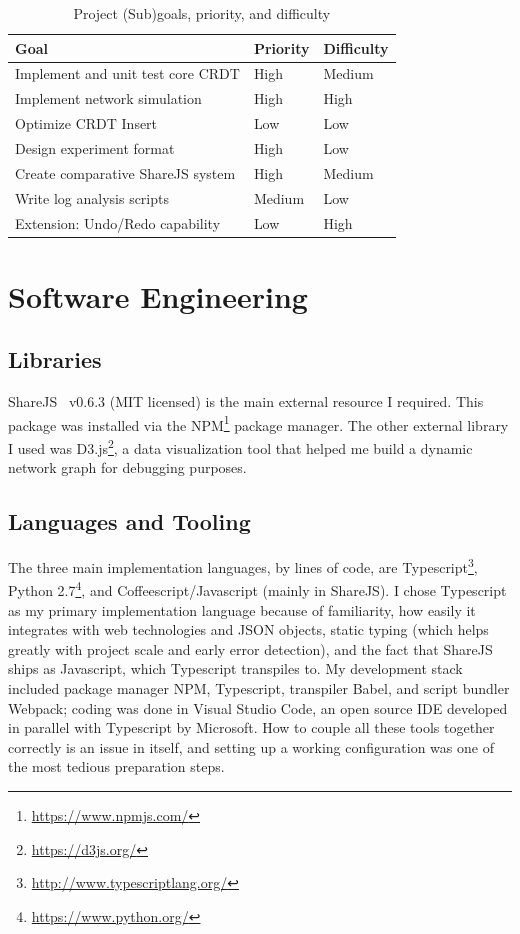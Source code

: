 \documentclass[12pt,a4paper,twoside,openright]{report}
\begin{document}
\begin{center}
\begin{table}[H]
\centering
\caption{Project (Sub)goals, priority, and difficulty}
\label{table: goals}
\begin{tabular}{@{}lll@{}}
Goal											 	& Priority & Difficulty \\ \toprule
Implement and unit test core CRDT                	& High     & Medium \\ \midrule
Implement network simulation                     	& High     & High   \\ \midrule
Optimize CRDT Insert                             	& Low      & Low    \\ \midrule
Design experiment format                         	& High     & Low    \\ \midrule
Create comparative ShareJS system					& High     & Medium \\ \midrule
Write log analysis scripts                       	& Medium   & Low    \\ \midrule
Extension: Undo/Redo capability						& Low	   & High 	\\ \bottomrule
\end{tabular}
\end{table}
\end{center}



\section{Software Engineering}

	\subsection{Libraries}
	ShareJS~\cite{sharejs} v0.6.3 (MIT licensed) is the main external resource I required. This package was installed via the NPM\footnote{\url{https://www.npmjs.com/}} package manager. The other external library I used was D3.js\footnote{\url{https://d3js.org/}}, a data visualization tool that helped me build a dynamic network graph for debugging purposes.
	
	\subsection{Languages and Tooling}
	The three main implementation languages, by lines of code, are Typescript\footnote{\url{http://www.typescriptlang.org/}}, Python 2.7\footnote{\url{https://www.python.org/}}, and Coffeescript/Javascript (mainly in ShareJS). I chose Typescript as my primary implementation language because of familiarity, how easily it integrates with web technologies and JSON objects, static typing (which helps greatly with project scale and early error detection), and the fact that ShareJS ships as Javascript, which Typescript transpiles to. My development stack included package manager NPM, Typescript, transpiler Babel, and script bundler Webpack; coding was done in Visual Studio Code, an open source IDE developed in parallel with Typescript by Microsoft. How to couple all these tools together correctly is an issue in itself, and setting up a working configuration was one of the most tedious preparation steps.
	
\end{document}
